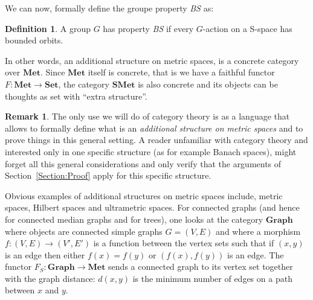 \documentclass[a4paper]{article}
\theoremstyle{definition}
\newtheorem{defn}[lem]{Definition}
\newtheorem{rem}[lem]{Remark}
\begin{document}
We can now, formally define the groupe property \emph{BS} as:
%
\begin{defn}
A group $G$ has property \emph{BS} if every $G$-action on a S-space has bounded orbits.
\end{defn}
%
%
In other words, an additional structure on metric spaces, is a concrete category over $\mathbf{Met}$. Since $\mathbf{Met}$ itself is concrete, that is we have a faithful functor $F\colon \mathbf{Met}\to\mathbf{Set}$, the category $\mathbf{SMet}$ is also concrete and its objects can be thoughts as set with ``extra structure''.
%
%
\begin{rem}
The only use we will do of category theory is as a language that allows to formally define what is an \emph{additional structure on metric spaces} and to prove things in this general setting.
A reader unfamiliar with category theory and interested only in one specific structure (as for example Banach spaces), might forget all this general considerations and only verify that the arguments of Section~\ref{Section:Proof} apply for this specific structure.
\end{rem}
%
%
Obvious examples of additional structures on metric spaces include, metric spaces, Hilbert spaces and ultrametric spaces.
For connected graphs (and hence for connected median graphs and for trees), one looks at the category $\mathbf{Graph}$ where objects are connected simple graphs $G=(V,E)$ and where a morphism $f\colon (V,E)\to(V',E')$ is a function between the vertex sets such that if $(x,y)$ is an edge then either $f(x)=f(y)$ or $(f(x),f(y))$ is an edge.
The functor $F_S\colon\mathbf{Graph}\to\mathbf{Met}$ sends a connected graph to its vertex set together with the graph distance: $d(x,y)$ is the minimum number of edges on a path between $x$ and $y$.
\end{document}
